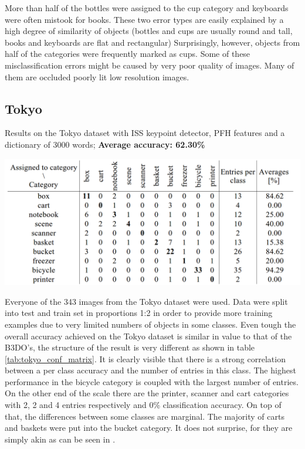 \documentclass[11pt,twoside]{article}
\begin{document}
    More than half of the bottles were assigned to the cup category and keyboards were often mistook for books. These two error types are easily explained by a high degree of similarity of objects (bottles and cups are usually round and tall, books and keyboards are flat and rectangular) Surprisingly, however, objects from half of the categories were frequently marked as cups. Some of these misclassification errors might be caused by very poor quality of images. Many of them are occluded poorly lit low resolution images.	

  \subsection{Tokyo}
    \begin{table}[!ht]
    \centering
    \caption{Results on the Tokyo dataset with ISS keypoint detector, PFH features and a dictionary of 3000 words; \textbf{Average accuracy: 62.30\%}}
    \includegraphics[width=1\textwidth]{../figs/tokyo_conf_matrix}	
    \label{tab:tokyo_conf_matrix}
    \end{table}

    Everyone of the 343 images from the Tokyo dataset were used. Data were split into test and train set in proportions 1:2 in order to provide more training examples due to very limited numbers of objects in some classes. Even tough the overall accuracy achieved on the Tokyo dataset is similar in value to that of the B3DO's, the structure of the result is very different as shown in table \ref{tab:tokyo_conf_matrix}. It is clearly visible that there is a strong correlation between a per class accuracy and the number of entries in this class. The highest performance in the bicycle category is coupled with the largest number of entries. On the other end of the scale there are the printer, scanner and cart categories with 2, 2 and 4 entries respectively and 0\% classification accuracy. On top of that, the differences between some classes are marginal. The majority of carts and baskets were put into the bucket category. It does not surprise, for they are simply akin as can be seen in .
\end{document}

